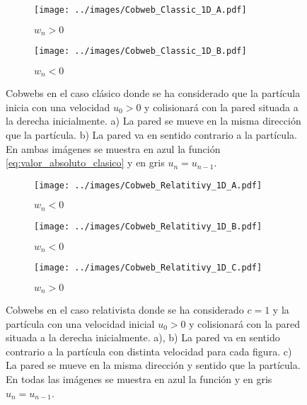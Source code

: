 \documentclass[11pt, spanish]{article}
\begin{document}
\begin{figure}[H]
    \centering
    \begin{subfigure}[b]{0.49\textwidth}
        \centering
        \texttt{[image: ../images/Cobweb\_Classic\_1D\_A.pdf]}
        \caption{$w_n>0$}
        \label{fig:Cobweb_Classic_1D_A}
    \end{subfigure}
    \hfill
    \begin{subfigure}[b]{0.49\textwidth}
        \centering
        \texttt{[image: ../images/Cobweb\_Classic\_1D\_B.pdf]}
        \caption{$w_n<0$}
        \label{fig:Cobweb_Classic_1D_B}
    \end{subfigure}
    \caption{Cobwebs en el caso clásico donde se ha considerado que la partícula inicia con una velocidad $u_0 > 0$ y colisionará con la pared situada a la derecha inicialmente. a) La pared se mueve en la misma dirección que la partícula. b) La pared va en sentido contrario a la partícula. En ambas imágenes se muestra en azul la función \ref{eq:valor_absoluto_clasico} y en gris \( u_n = u_{n-1} \).}
        \label{fig:Cobweb_Classic_1D}
\end{figure}

\begin{figure}[H]
    \centering
    \begin{subfigure}[b]{0.3\textwidth}
        \centering
        \texttt{[image: ../images/Cobweb\_Relatitivy\_1D\_A.pdf]}
        \caption{$w_n<0$}
        \label{fig:Cobweb_Rel_1D_A}
    \end{subfigure}
    \hfill
    \begin{subfigure}[b]{0.3\textwidth}
        \centering
        \texttt{[image: ../images/Cobweb\_Relatitivy\_1D\_B.pdf]}
        \caption{$w_n<0$}
        \label{fig:Cobweb_Rel_1D_B}
    \end{subfigure}
    \hfill
    \begin{subfigure}[b]{0.3\textwidth}
        \centering
        \texttt{[image: ../images/Cobweb\_Relatitivy\_1D\_C.pdf]}
        \caption{$w_n>0$}
        \label{fig:Cobweb_Rel_1D_C}
    \end{subfigure}
    \caption{Cobwebs en el caso relativista donde se ha considerado \( c=1 \) y la partícula  con una velocidad inicial $u_0 > 0$ y colisionará con la pared situada a la derecha inicialmente. a), b) La pared va en sentido contrario a la partícula con distinta velocidad para cada figura. c) La pared se mueve en la misma dirección y sentido que la partícula. En todas las imágenes se muestra en azul la función  y en gris \( u_n = u_{n-1} \).}
        \label{fig:Cobweb_Rel_1D}
\end{figure}
\end{document}
